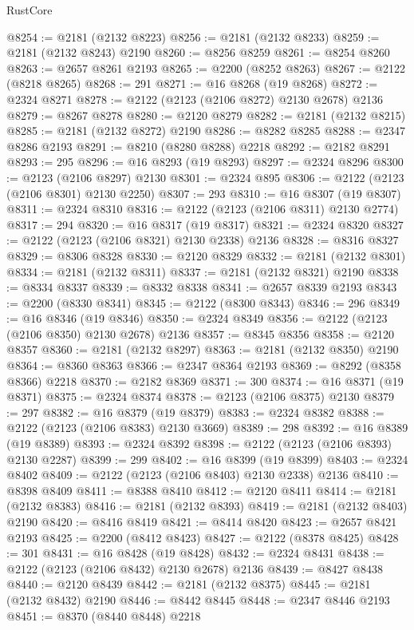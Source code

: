 \begin{lexlean}{RustCore}
\begin{coremodule}
@8254 := @2181 (@2132 @8223)
@8256 := @2181 (@2132 @8233)
@8259 := @2181 (@2132 @8243) @2190
@8260 := @8256 @8259
@8261 := @8254 @8260
@8263 := @2657 @8261 @2193
@8265 := @2200 (@8252 @8263)
@8267 := @2122 (@8218 @8265)
@8268 := 291
@8271 := @16 @8268 (@19 @8268)
@8272 := @2324 @8271
@8278 := @2122 (@2123 (@2106 @8272) @2130 @2678) @2136
@8279 := @8267 @8278
@8280 := @2120 @8279
@8282 := @2181 (@2132 @8215)
@8285 := @2181 (@2132 @8272) @2190
@8286 := @8282 @8285
@8288 := @2347 @8286 @2193
@8291 := @8210 (@8280 @8288) @2218
@8292 := @2182 @8291
@8293 := 295
@8296 := @16 @8293 (@19 @8293)
@8297 := @2324 @8296
@8300 := @2123 (@2106 @8297) @2130
@8301 := @2324 @895
@8306 := @2122 (@2123 (@2106 @8301) @2130 @2250)
@8307 := 293
@8310 := @16 @8307 (@19 @8307)
@8311 := @2324 @8310
@8316 := @2122 (@2123 (@2106 @8311) @2130 @2774)
@8317 := 294
@8320 := @16 @8317 (@19 @8317)
@8321 := @2324 @8320
@8327 := @2122 (@2123 (@2106 @8321) @2130 @2338) @2136
@8328 := @8316 @8327
@8329 := @8306 @8328
@8330 := @2120 @8329
@8332 := @2181 (@2132 @8301)
@8334 := @2181 (@2132 @8311)
@8337 := @2181 (@2132 @8321) @2190
@8338 := @8334 @8337
@8339 := @8332 @8338
@8341 := @2657 @8339 @2193
@8343 := @2200 (@8330 @8341)
@8345 := @2122 (@8300 @8343)
@8346 := 296
@8349 := @16 @8346 (@19 @8346)
@8350 := @2324 @8349
@8356 := @2122 (@2123 (@2106 @8350) @2130 @2678) @2136
@8357 := @8345 @8356
@8358 := @2120 @8357
@8360 := @2181 (@2132 @8297)
@8363 := @2181 (@2132 @8350) @2190
@8364 := @8360 @8363
@8366 := @2347 @8364 @2193
@8369 := @8292 (@8358 @8366) @2218
@8370 := @2182 @8369
@8371 := 300
@8374 := @16 @8371 (@19 @8371)
@8375 := @2324 @8374
@8378 := @2123 (@2106 @8375) @2130
@8379 := 297
@8382 := @16 @8379 (@19 @8379)
@8383 := @2324 @8382
@8388 := @2122 (@2123 (@2106 @8383) @2130 @3669)
@8389 := 298
@8392 := @16 @8389 (@19 @8389)
@8393 := @2324 @8392
@8398 := @2122 (@2123 (@2106 @8393) @2130 @2287)
@8399 := 299
@8402 := @16 @8399 (@19 @8399)
@8403 := @2324 @8402
@8409 := @2122 (@2123 (@2106 @8403) @2130 @2338) @2136
@8410 := @8398 @8409
@8411 := @8388 @8410
@8412 := @2120 @8411
@8414 := @2181 (@2132 @8383)
@8416 := @2181 (@2132 @8393)
@8419 := @2181 (@2132 @8403) @2190
@8420 := @8416 @8419
@8421 := @8414 @8420
@8423 := @2657 @8421 @2193
@8425 := @2200 (@8412 @8423)
@8427 := @2122 (@8378 @8425)
@8428 := 301
@8431 := @16 @8428 (@19 @8428)
@8432 := @2324 @8431
@8438 := @2122 (@2123 (@2106 @8432) @2130 @2678) @2136
@8439 := @8427 @8438
@8440 := @2120 @8439
@8442 := @2181 (@2132 @8375)
@8445 := @2181 (@2132 @8432) @2190
@8446 := @8442 @8445
@8448 := @2347 @8446 @2193
@8451 := @8370 (@8440 @8448) @2218

\end{coremodule}
\end{lexlean}

